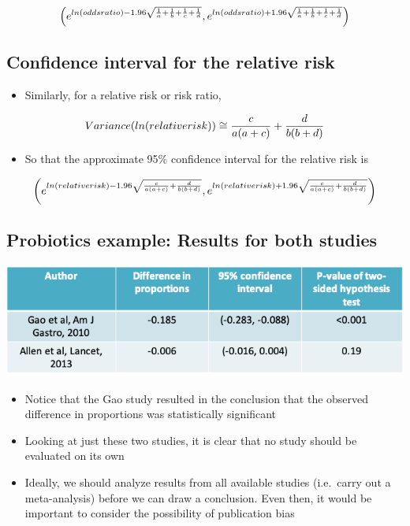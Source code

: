 \documentclass[
]{book}
\providecommand{\tightlist}{%
  \setlength{\itemsep}{0pt}\setlength{\parskip}{0pt}}
\begin{document}
\[\left(e^{ln(odds\space ratio)-1.96\sqrt{\frac{1}{a}+\frac{1}{b}+\frac{1}{c}+\frac{1}{d}}},e^{ln(odds\space ratio)+1.96\sqrt{\frac{1}{a}+\frac{1}{b}+\frac{1}{c}+\frac{1}{d}}}\right)\]

\hypertarget{confidence-interval-for-the-relative-risk}{%
\subsection{Confidence interval for the relative risk}\label{confidence-interval-for-the-relative-risk}}

\begin{itemize}
\tightlist
\item
  Similarly, for a relative risk or risk ratio,
\end{itemize}

\[Variance(ln(relative\space risk))\cong\frac{c}{a(a+c)}+\frac{d}{b(b+d)}\]

\begin{itemize}
\tightlist
\item
  So that the approximate 95\% confidence interval for the relative risk is
\end{itemize}

\[\left(e^{ln(relative\space risk)-1.96\sqrt{\frac{c}{a(a+c)}+\frac{d}{b(b+d)}}},e^{ln(relative\space risk)+1.96\sqrt{\frac{c}{a(a+c)}+\frac{d}{b(b+d)}}}\right)\]

\hypertarget{probiotics-example-results-for-both-studies-1}{%
\subsection{Probiotics example: Results for both studies}\label{probiotics-example-results-for-both-studies-1}}

\includegraphics[width=1\linewidth]{./8_9}

\begin{itemize}
\tightlist
\item
  Notice that the Gao study resulted in the conclusion that the observed difference in proportions was statistically significant
\item
  Looking at just these two studies, it is clear that no study should be evaluated on its own
\item
  Ideally, we should analyze results from all available studies (i.e.~carry out a meta-analysis) before we can draw a conclusion. Even then, it would be important to consider the possibility of publication bias
\end{itemize}
\end{document}
